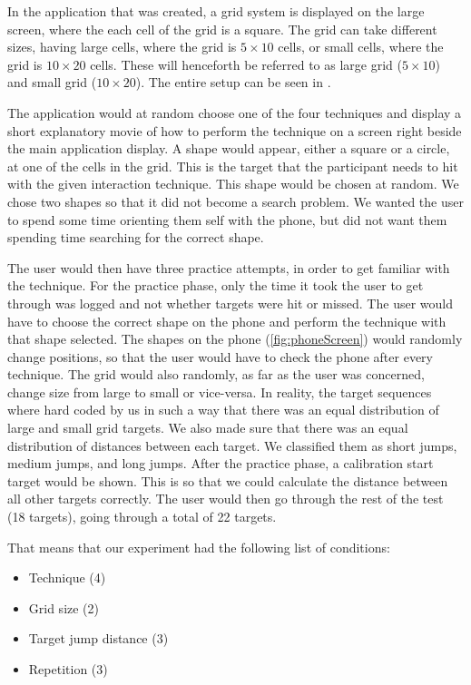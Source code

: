 In the application that was created, a grid system is displayed on the large screen, where the each cell of the grid is a square. 
The grid can take different sizes, having large cells, where the grid is $5 \times 10$ cells, or small cells, where the grid is $10 \times 20$ cells. 
These will henceforth be referred to as large grid ($5 \times 10$) and small grid ($10 \times 20$). The entire setup can be seen in .

The application would at random choose one of the four techniques and display a short explanatory movie of how to perform the technique on a screen right beside the main application display. 
A shape would appear, either a square or a circle, at one of the cells in the grid. This is the target that the participant needs to hit with the given interaction technique. This shape would be chosen at random. We chose two shapes so that it did not become a search problem. We wanted the user to spend some time orienting them self with the phone, but did not want them spending time searching for the correct shape.

The user would then have three practice attempts, in order to get familiar with the technique. 
For the practice phase, only the time it took the user to get through was logged and not whether targets were hit or missed. 
The user would have to choose the correct shape on the phone and perform the technique with that shape selected. 
The shapes on the phone (\cref{fig:phoneScreen}) would randomly change positions, so that the user would have to check the phone after every technique. 
The grid would also randomly, as far as the user was concerned, change size from large to small or vice-versa. In reality, the target sequences where hard coded by us in such a way that there was an equal distribution of large and small grid targets. We also made sure that there was an equal distribution of distances between each target. We classified them as short jumps, medium jumps, and long jumps. 
After the practice phase, a calibration start target would be shown. This is so that we could calculate the distance between all other targets correctly. The user would then go through the rest of the test (18 targets), going through a total of 22 targets. 

That means that our experiment had the following list of conditions:
\begin{itemize}
	 \item Technique (4)
	 \item Grid size (2)
	 \item Target jump distance (3)
	 \item Repetition (3)
\end{itemize}

